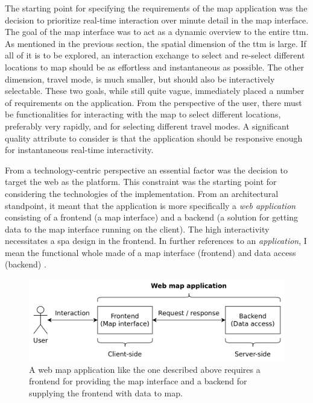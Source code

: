 The starting point for specifying the requirements of the map application
was the decision to prioritize real-time interaction over minute detail in the map interface.
The goal of the map interface was to act as a dynamic overview to the entire \acrshort{ttm}.
As mentioned in the previous section,
the spatial dimension of the \acrshort{ttm} is large.
If all of it is to be explored,
an interaction exchange to select and re-select different locations to map
should be as effortless and instantaneous as possible.
The other dimension, travel mode, is much smaller,
but should also be interactively selectable.
These two goals, while still quite vague,
immediately placed a number of requirements on the application.
From the perspective of the user,
there must be functionalities for interacting with the map to
select different locations, preferably very rapidly,
and for selecting different travel modes.
A significant quality attribute to consider is that the application should
be responsive enough for instantaneous real-time interactivity.

From a technology-centric perspective an essential factor was
the decision to target the web as the platform.
This constraint was the starting point for considering the technologies
of the implementation.
From an architectural standpoint,
it meant that the application is more specifically a \textit{web application}
consisting of a frontend (a map interface) and a backend
(a solution for getting data to the map interface running on the client).
The high interactivity necessitates a \acrshort{spa} design in the frontend.
In further references to an \textit{application},
I mean the functional whole made of a map interface (frontend) and data access (backend)
.

\begin{figure}[H]
	\centering
	\includegraphics[width=\diagramwidth]{visual/figures/diagrams/web_map_app}
	\caption{
		A web map application like the one described above requires
		a frontend for providing the map interface
		and a backend for supplying the frontend with data to map.
	}
	\label{fig:web map app}
\end{figure}

